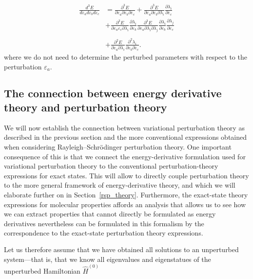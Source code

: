 \documentclass[%
 reprint,
 amsmath,amssymb,
 aps,
]{revtex4-1}
\begin{document}
\begin{align}
\frac{d^{3}E}{d\varepsilon_ad\varepsilon_bd\varepsilon_c} & =
\frac{\partial^{3}E}{\partial\varepsilon_a\partial\varepsilon_b\partial\varepsilon_c}+\frac{\partial^{3}E}{\partial\varepsilon_a\partial\varepsilon_b\partial\lambda_{i}}\frac{\partial\lambda_{i}}{\partial\varepsilon_c}
\\ & \nonumber + \frac{\partial^{3}E}{\partial\varepsilon_a\varepsilon_c\partial\lambda_{i}}\frac{\partial\lambda_{i}}{\partial\varepsilon_b}
\frac{\partial^{3}E}{\partial\varepsilon_a\partial\lambda_{i}\partial\lambda_{j}}\frac{\partial\lambda_{i}}{\partial\varepsilon_b}\frac{\partial\lambda_{j}}{\partial\varepsilon_c}\\\nonumber\\&+
\frac{\partial^{2}E}{\partial\varepsilon_a\partial\lambda_{i}}\frac{\partial^{2}\lambda_{i}}{\partial\varepsilon_b\partial\varepsilon_c}.
\end{align}
where we do not need to determine the perturbed parameters with respect to the
perturbation $\varepsilon_a$.

\subsection{The connection between energy derivative theory and perturbation theory}

We will now establish the connection between variational perturbation theory as
described in the previous section and the more conventional expressions
obtained when considering Rayleigh--Schrödinger perturbation theory. One
important consequence of this is that we connect the energy-derivative
formulation used for variational perturbation theory to the conventional
perturbation-theory expressions for exact states. This will allow to directly
couple perturbation theory to the more general framework of energy-derivative
theory, and which we will elaborate further on in Section~\ref{rsp_theory}.
Furthermore, the exact-state theory expressions for molecular properties
affords an analysis that allows us to see how we can extract properties that
cannot directly be formulated as energy derivatives nevertheless can be
formulated in this formalism by the correspondence to the exact-state
perturbation theory expressions.

Let us therefore assume that we have obtained all solutions to an unperturbed
system---that is, that we know all eigenvalues and eigenstatues of the
unperturbed Hamiltonian $\hat{H}^{(0)}$
\end{document}
